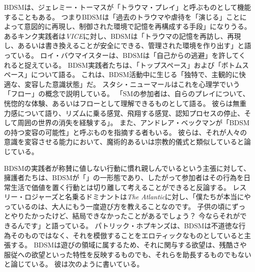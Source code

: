 \documentclass[paper=a4,book,openany]{jlreq}
\begin{document}
BDSMは、ジェレミー・トーマスが「トラウマ・プレイ」と呼ぶものとして機能することもある。
つまりBDSMは「過去のトラウマや虐待を「演じる」ことによって意図的に再現し、制御された環境で記憶を再構成する手段」になりうる\citep{thomas20:_bdsm_traum_play}。
あるキンク実践者は\emph{VICE}に対し、BDSMは「トラウマの記憶を再訪し、再現し、あるいは書き換えることが安全にできる、管理された環境を作り出す」と語っている\citep{barrett-ibarria17:_bsdm_can_provid_profoun_healin_exper}。
ロイ・バウマイスターは、BDSMは「自己からの逃避」を許してくれると捉えている\citep[p.29]{baumeister88:_masoc_escap_self}。
BDSM実践者たちは、「トップスペース」および「ボトムスペース」について語る。
これは、BDSM活動中に生じる「独特で、主観的に快適な、変容した意識状態」だ\citep[p.77]{ambler17:_consen_bdsm_facil_role_specif}。
スタシ・ニューマールはこれを心理学でいう「フロー」の概念で説明している。
「SMの参加者は、自らのプレイについて、恍惚的な体験、あるいはフローとして理解できるものとして語る。
彼らは無重力感について語り、リズムに乗る感覚、飛翔する感覚、認知プロセスの停止、そして周囲の世界の消失を経験する」\citep[p.328]{newmahr10:_rethin_kink}。
また、アンドレア・ベックマンが「BDSMの持つ変容の可能性」と呼ぶものを指摘する者もいる\citep{beckman01:_decon_myths}。
彼らは、それが人々の意識を変容させる能力において、魔術的あるいは宗教的儀式と類似していると論じている\citep{comfort78:_sexual_idios,norman04:_i_am_leath_shaman}。

BDSMの実践者が称賛に値しない行動に慣れ親しんでいるという主張に対して、擁護者たちは、BDSMが「」の一形態であり、したがって参加者はその行為を日常生活で価値を置く行動とは切り離して考えることができると反論する。
レスリー・ロジャーズと名乗るドミナントは\emph{The Atlantic}に対し、「僕たちが本当にやっているのは、大人にもう一度遊び方を教えることなのです。
子供の頃にずっとやりたかったけど、結局できなかったことがあるでしょう？ 今ならそれができるんです」と語っている\citep{morin15:_that_time_i_tried_bdsm_therap}。
パトリック・ホプキンズは、BDSMは不道徳な行為そのものではなく、それを模倣することをエロティックなものとしていると主張する。
BDSMは遊びの領域に属するため、それに関与する欲望は、残酷さや服従への欲望といった特性を反映するものでも、それらを助長するものでもないと論じている。
彼は次のように書いている。
\end{document}

